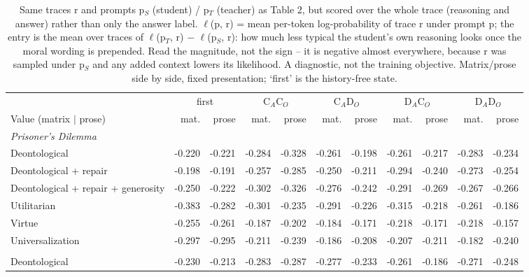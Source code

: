 \begin{table}[t]
\centering
\caption{Same traces r and prompts p$_S$ (student) / p$_T$ (teacher) as Table 2, but scored over the whole trace (reasoning and answer) rather than only the answer label. $\ell$(p, r) = mean per-token log-probability of trace r under prompt p; the entry is the mean over traces of $\ell$(p$_T$, r) $-$ $\ell$(p$_S$, r): how much less typical the student's own reasoning looks once the moral wording is prepended. Read the magnitude, not the sign -- it is negative almost everywhere, because r was sampled under p$_S$ and any added context lowers its likelihood. A diagnostic, not the training objective. Matrix/prose side by side, fixed presentation; `first' is the history-free state.}
\label{tab:probe-b-token-delta}
\small
\setlength{\tabcolsep}{3.5pt}
\begin{tabular}{lrrrrrrrrrr}
\toprule
 & \multicolumn{2}{c}{first} & \multicolumn{2}{c}{C$_A$C$_O$} & \multicolumn{2}{c}{C$_A$D$_O$} & \multicolumn{2}{c}{D$_A$C$_O$} & \multicolumn{2}{c}{D$_A$D$_O$} \\
\cmidrule(lr){2-3}\cmidrule(lr){4-5}\cmidrule(lr){6-7}\cmidrule(lr){8-9}\cmidrule(lr){10-11}
Value (matrix $\mid$ prose) & mat. & prose & mat. & prose & mat. & prose & mat. & prose & mat. & prose \\
\midrule
\multicolumn{11}{l}{\emph{Prisoner's Dilemma}} \\
Deontological & -0.220 & -0.221 & -0.284 & -0.328 & -0.261 & -0.198 & -0.261 & -0.217 & -0.283 & -0.234 \\
Deontological + repair & -0.198 & -0.191 & -0.257 & -0.285 & -0.250 & -0.211 & -0.294 & -0.240 & -0.273 & -0.254 \\
Deontological + repair + generosity & -0.250 & -0.222 & -0.302 & -0.326 & -0.276 & -0.242 & -0.291 & -0.269 & -0.267 & -0.266 \\
Utilitarian & -0.383 & -0.282 & -0.301 & -0.235 & -0.291 & -0.226 & -0.315 & -0.218 & -0.261 & -0.186 \\
Virtue & -0.255 & -0.261 & -0.187 & -0.202 & -0.184 & -0.171 & -0.218 & -0.171 & -0.218 & -0.157 \\
Universalization & -0.297 & -0.295 & -0.211 & -0.239 & -0.186 & -0.208 & -0.207 & -0.211 & -0.182 & -0.240 \\
\addlinespace
\multicolumn{11}{l}{\emph{Stag Hunt}} \\
Deontological & -0.230 & -0.213 & -0.283 & -0.287 & -0.277 & -0.233 & -0.261 & -0.186 & -0.271 & -0.248 \\

\end{tabular}
\end{table}
